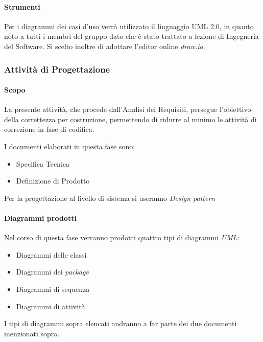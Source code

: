			
			\paragraph*{Strumenti}
				Per i diagrammi dei casi d'uso verrà utilizzato il linguaggio UML 2.0,
				in quanto noto a tutti i membri del gruppo dato che è stato trattato a lezione
				di Ingegneria del Software.
				Si scelto inoltre di adottare l'editor online \emph{draw.io}.
			
			
		\subsubsection{Attività di Progettazione}
			\paragraph*{Scopo}
		     La presente attività, che procede dall'Analisi dei Requisiti, persegue l'obiettivo
		     della correttezza per costruzione, permettendo di ridurre al minimo le attività di correzione
		     in fase di codifica.
		     
                     I documenti elaborati in questa fase sono:
                     \begin{itemize}
                       \item Specifica Tecnica
                       \item Definizione di Prodotto
                     \end{itemize}
		 
		 Per la progettazione al livello di sistema si useranno \textit{Design pattern}
                 
                      \paragraph*{Diagrammi prodotti}
                      Nel corso di questa fase verranno prodotti quattro tipi di diagrammi \textit{UML}:
                      \begin{itemize}
                        \item Diagrammi delle classi
                        \item Diagrammi dei \textit{package}
                        \item Diagrammi di sequenza
                        \item Diagrammi di attività
                      \end{itemize}
                      I tipi di diagrammi sopra elencati andranno a far parte dei due documenti menzionati sopra.
		
